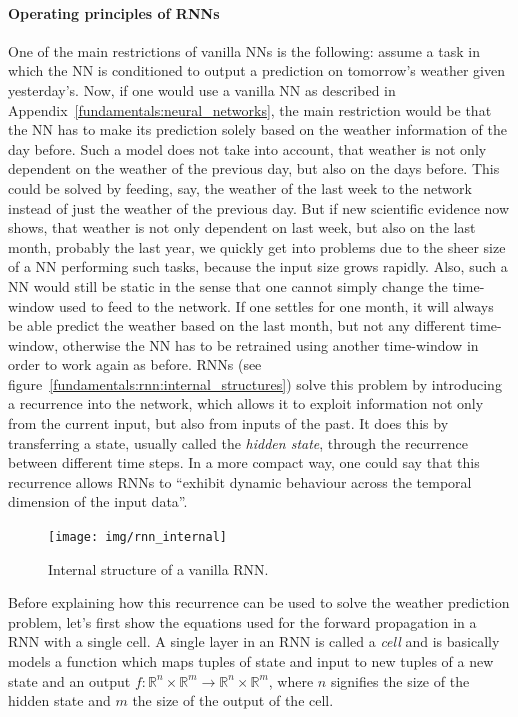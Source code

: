 \paragraph{Operating principles of RNNs}
One of the main restrictions of vanilla NNs is the following: assume a task in which the NN is conditioned to output a prediction on tomorrow's weather given yesterday's. Now, if one would use a vanilla NN as described in Appendix~\ref{fundamentals:neural_networks}, the main restriction would be that the NN has to make its prediction solely based on the weather information of the day before. Such a model does not take into account, that weather is not only dependent on the weather of the previous day, but also on the days before. This could be solved by feeding, say, the weather of the last week to the network instead of just the weather of the previous day. But if new scientific evidence now shows, that weather is not only dependent on last week, but also on the last month, probably the last year, we quickly get into problems due to the sheer size of a NN performing such tasks, because the input size grows rapidly. Also, such a NN would still be static in the sense that one cannot simply change the time-window used to feed to the network. If one settles for one month, it will always be able predict the weather based on the last month, but not any different time-window, otherwise the NN has to be retrained using another time-window in order to work again as before. RNNs (see figure~\ref{fundamentals:rnn:internal_structures}) solve this problem by introducing a recurrence into the network, which allows it to exploit information not only from the current input, but also from inputs of the past. It does this by transferring a state, usually called the \emph{hidden state}, through the recurrence between different time steps. In a more compact way, one could say that this recurrence allows RNNs to ``exhibit dynamic behaviour across the temporal dimension of the input data''.

\begin{figure}[h]
	\label{fundamentals:rnn:internal_structure}
	\centering
	\texttt{[image: img/rnn\_internal]}
	\caption{Internal structure of a vanilla RNN.\protect\footnotemark}
\end{figure}

Before explaining how this recurrence can be used to solve the weather prediction problem, let's first show the equations used for the forward propagation in a RNN with a single cell. A single layer in an RNN is called a \emph{cell} and is basically models a function which maps tuples of state and input to new tuples of a new state and an output $f\colon \mathbb{R}^n \times \mathbb{R}^m \rightarrow \mathbb{R}^n \times \mathbb{R}^m$, where $n$ signifies the size of the hidden state and $m$ the size of the output of the cell.

